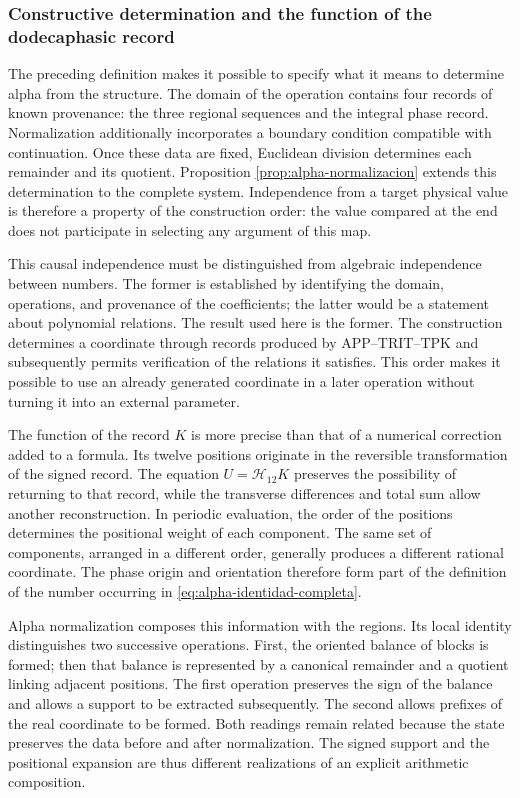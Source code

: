 \subsubsection{Constructive determination and the function of the dodecaphasic record}
\label{alpha-ampl-dependencias}

The preceding definition makes it possible to specify what it means to determine alpha
from the structure. The domain of the operation contains four records of
known provenance: the three regional sequences and the integral phase
record. Normalization additionally incorporates a boundary condition
compatible with continuation. Once these data are fixed, Euclidean
division determines each remainder and its quotient. Proposition
\ref{prop:alpha-normalizacion} extends this determination to the complete
system. Independence from a target physical value is therefore
a property of the construction order: the value compared at the
end does not participate in selecting any argument of this
map.

This causal independence must be distinguished from algebraic independence
between numbers. The former is established by identifying the domain,
operations, and provenance of the coefficients; the latter would be
a statement about polynomial relations. The result used here is the
former. The construction determines a coordinate through records
produced by APP--TRIT--TPK and subsequently permits verification of the
relations it satisfies. This order makes it possible to use an already
generated coordinate in a later operation without turning it into an external parameter.

The function of the record $K$ is more precise than that of a numerical
correction added to a formula. Its twelve positions originate in the
reversible transformation of the signed record. The equation
$U=\mathcal H_{12}K$ preserves the possibility of returning to that record,
while the transverse differences and total sum allow another
reconstruction. In periodic evaluation, the order of the positions
determines the positional weight of each component. The same set of
components, arranged in a different order, generally produces a different rational
coordinate. The phase origin and orientation therefore form part of the
definition of the number occurring in \eqref{eq:alpha-identidad-completa}.

Alpha normalization composes this information with the regions. Its
local identity distinguishes two successive operations. First, the
oriented balance of blocks is formed; then that balance is represented by
a canonical remainder and a quotient linking adjacent positions. The first
operation preserves the sign of the balance and allows a support to be
extracted subsequently. The second allows prefixes of the real coordinate
to be formed. Both readings remain related because the state preserves the
data before and after normalization. The signed support and the
positional expansion are thus different realizations of an explicit
arithmetic composition.

